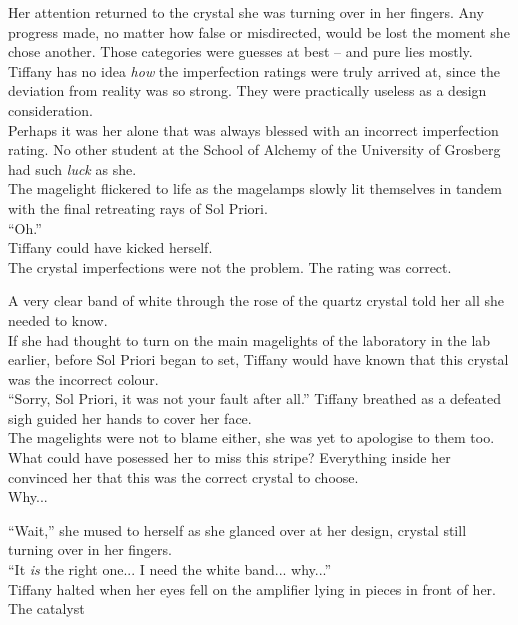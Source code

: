 Her attention returned to the crystal she was turning over in her fingers.
Any progress made, no matter how false or misdirected, would be lost the moment she chose another.
Those categories were guesses at best -- and pure lies mostly. 
Tiffany has no idea \textit{how} the imperfection ratings were truly arrived at, since the deviation from reality was so strong. 
They were practically useless as a design consideration.\\

Perhaps it was her alone that was always blessed with an incorrect imperfection rating.
No other student at the School of Alchemy of the University of Grosberg had such \textit{luck} as she.\\

The magelight flickered to life as the magelamps slowly lit themselves in tandem with the final retreating rays of Sol Priori.\\

``Oh.''\\

Tiffany could have kicked herself.\\

The crystal imperfections were not the problem. 
The rating was correct.

A very clear band of white through the rose of the quartz crystal told her all she needed to know.\\

If she had thought to turn on the main magelights of the laboratory in the lab earlier, before Sol Priori began to set, Tiffany would have known that this crystal was the incorrect colour.\\

``Sorry, Sol Priori, it was not your fault after all.'' Tiffany breathed as a defeated sigh guided her hands to cover her face.\\

The magelights were not to blame either, she was yet to apologise to them too.
What could have posessed her to miss this stripe? 
Everything inside her convinced her that this was the correct crystal to choose.\\

Why...

``Wait,'' she mused to herself as she glanced over at her design, crystal still turning over in her fingers.\\

``It \textit{is} the right one... I need the white band... why...''\\

Tiffany halted when her eyes fell on the amplifier lying in pieces in front of her. The catalyst